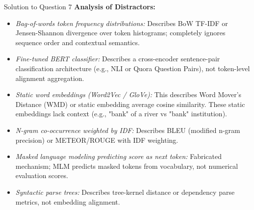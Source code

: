 \documentclass[11pt,a4paper]{article}
\begin{document}
\begin{solutionbox}{Solution to Question 7}
\medskip
\textbf{Analysis of Distractors:}
\begin{itemize}[leftmargin=1.5cm]
    \item[\textbf{(a)}] \textit{Bag-of-words token frequency distributions:} Describes BoW TF-IDF or Jensen-Shannon divergence over token histograms; completely ignores sequence order and contextual semantics.
    \item[\textbf{(b)}] \textit{Fine-tuned BERT classifier:} Describes a cross-encoder sentence-pair classification architecture (e.g., NLI or Quora Question Pairs), not token-level alignment aggregation.
    \item[\textbf{(c)}] \textit{Static word embeddings (Word2Vec / GloVe):} This describes Word Mover's Distance (WMD) or static embedding average cosine similarity. These static embeddings lack context (e.g., "bank" of a river vs "bank" institution).
    \item[\textbf{(e)}] \textit{N-gram co-occurrence weighted by IDF:} Describes BLEU (modified n-gram precision) or METEOR/ROUGE with IDF weighting.
    \item[\textbf{(f)}] \textit{Masked language modeling predicting score as next token:} Fabricated mechanism; MLM predicts masked tokens from vocabulary, not numerical evaluation scores.
    \item[\textbf{(g)}] \textit{Syntactic parse trees:} Describes tree-kernel distance or dependency parse metrics, not embedding alignment.
\end{itemize}
\end{solutionbox}

\bigskip
\end{document}
